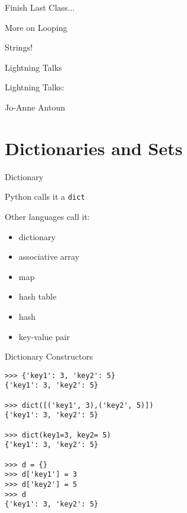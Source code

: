 \documentclass{beamer}
\begin{document}
\begin{frame}{Finish Last Class...}

  \vfill
  {\Large More on Looping}

  \vfill
  {\Large Strings!}

  \vfill

\end{frame}

\begin{frame}{Lightning Talks}

{\LARGE Lightning Talks:}

\vfill
{\Large
Jo-Anne Antoun

}
\vfill

\end{frame}


\section{Dictionaries and Sets}

\begin{frame}[fragile]{Dictionary}

{\Large Python calls it a \verb|dict| }

\vfill
{\Large Other languages call it:}
\begin{itemize}
  \item dictionary
  \item associative array
  \item map
  \item hash table
  \item hash
  \item key-value pair
\end{itemize}

\vfill

\end{frame} 

\begin{frame}[fragile]{Dictionary Constructors}

\begin{verbatim}
>>> {'key1': 3, 'key2': 5}
{'key1': 3, 'key2': 5}

>>> dict([('key1', 3),('key2', 5)])
{'key1': 3, 'key2': 5}

>>> dict(key1=3, key2= 5)
{'key1': 3, 'key2': 5}

>>> d = {}
>>> d['key1'] = 3
>>> d['key2'] = 5
>>> d
{'key1': 3, 'key2': 5}
\end{verbatim}

\end{frame} 
\end{document}
